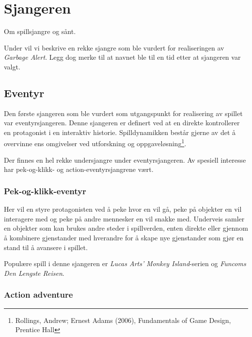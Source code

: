 \section{Sjangeren}\label{sec:sjangre}
Om spillsjangre og sånt.




Under vil vi beskrive en rekke sjangre som ble vurdert for realiseringen av \emph{Garbage Alert}. Legg dog merke til at navnet ble til en tid etter at sjangeren var valgt.

\subsection{Eventyr}\label{sec:eventyr}
Den første sjangeren som ble vurdert som utgangspunkt for realisering av spillet var eventyrsjangeren. Denne sjangeren er definert ved at en direkte kontrollerer en protagonist i en interaktiv historie. Spilldynamikken består gjerne av det å overvinne ens omgivelser ved utforskning og oppgaveløsning\footnote{Rollings, Andrew; Ernest Adams (2006), Fundamentals of Game Design, Prentice Hall}.

Der finnes en hel rekke undersjangre under eventyrsjangeren. Av spesiell interesse har pek-og-klikk- og action-eventyrsjangrene vært.
	
	\subsubsection{Pek-og-klikk-eventyr}

	Her vil en styre protagonisten ved å peke hvor en vil gå, peke på objekter en vil interagere med og peke på andre mennesker en vil snakke med. Underveis samler en objekter som kan brukes andre steder i spillverden, enten direkte eller gjennom å kombinere gjenstander med hverandre for å skape nye gjenstander som gjør en  stand til å avansere i spillet.

	Populære spill i denne sjangeren er \emph{Lucas Arts'} \emph{Monkey Island}-serien og \emph{Funcoms} \emph{Den Lengste Reisen}.


	\subsubsection{Action adventure}

